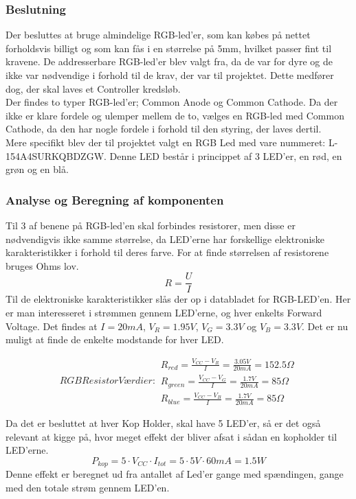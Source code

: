 \documentclass[HardwareDesign/HardwareDesign_main.tex]{subfiles}
\begin{document}
\subsubsection{Beslutning}
Der besluttes at bruge almindelige RGB-led'er, som kan købes på nettet forholdsvis billigt og som kan fås i en størrelse på 5mm, hvilket passer fint til kravene. De addresserbare  RGB-led'er blev valgt fra, da de var for dyre og de ikke var nødvendige i forhold til de krav, der var til projektet. Dette medfører dog, der skal laves et Controller kredsløb.\\
Der findes to typer RGB-led'er; Common Anode og Common Cathode. Da der ikke er klare fordele og ulemper mellem de to, vælges en RGB-led med Common Cathode, da den har nogle fordele i forhold til den styring, der laves dertil.\\
Mere specifikt blev der til projektet valgt en RGB Led med vare nummeret: \textsc{L-154A4SURKQBDZGW}\cite{RGBledDatasheet}. Denne LED består i princippet af 3 LED'er, en rød, en grøn og en blå.
\subsubsection{Analyse og Beregning af komponenten}
Til 3 af benene på RGB-led'en skal forbindes resistorer, men disse er nødvendigvis ikke samme størrelse, da LED'erne har forskellige elektroniske karakteristikker i forhold til deres farve. For at finde størrelsen af resistorene bruges Ohms lov.
\begin{equation}
    R=\frac{U}{I}
\end{equation}
Til de elektroniske karakteristikker slås der op i databladet for RGB-LED'en\cite{RGBledDatasheet}. Her er man interesseret i strømmen gennem LED'erne, og hver enkelts Forward Voltage. Det findes at $I=20mA$, $V_R=1.95V$, $V_G=3.3V$ og $V_B=3.3V$. Det er nu muligt at finde de enkelte modstande for hver LED.

\begin{subequations}
        RGB Resistor Værdier:
\begin{align}
        R_{red}=\frac{V_{CC}-V_R}{I}=\frac{3.05V}{20mA}=152.5\Omega\\
        R_{green}=\frac{V_{CC}-V_G}{I}=\frac{1.7V}{20mA}=85\Omega\\
        R_{blue}=\frac{V_{CC}-V_B}{I}=\frac{1.7V}{20mA}=85\Omega
\end{align}
\end{subequations}

Da det er besluttet at hver Kop Holder, skal have 5 LED'er, så er det også relevant at kigge på, hvor meget effekt der bliver afsat i sådan en kopholder til LED'erne.
\begin{equation}
    P_{kop}=5\cdot V_{CC}\cdot I_{tot} = 5\cdot 5V\cdot 60mA = 1.5W
\end{equation}
Denne effekt er beregnet ud fra antallet af Led'er gange med spændingen, gange med den totale strøm gennem LED'en.
\end{document}
